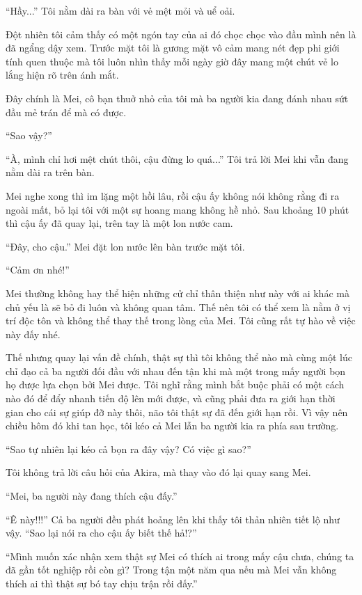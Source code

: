{``Hầy...'' Tôi nằm dài ra bàn với vẻ mệt mỏi và uể oải.

Đột nhiên tôi cảm thấy có một ngón tay của ai đó chọc chọc vào đầu mình
nên là đã ngẩng dậy xem. Trước mặt tôi là gương mặt vô cảm mang nét đẹp
phi giới tính quen thuộc mà tôi luôn nhìn thấy mỗi ngày giờ đây mang một
chút vẻ lo lắng hiện rõ trên ánh mắt.

Đây chính là Mei, cô bạn thuở nhỏ của tôi mà ba người kia đang đánh nhau
sứt đầu mẻ trán để mà có được.

``Sao vậy?''

``À, mình chỉ hơi mệt chút thôi, cậu đừng lo quá...'' Tôi trả lời Mei
khi vẫn đang nằm dài ra trên bàn.

Mei nghe xong thì im lặng một hồi lâu, rồi cậu ấy không nói không rằng
đi ra ngoài mất, bỏ lại tôi với một sự hoang mang không hề nhỏ. Sau
khoảng 10 phút thì cậu ấy đã quay lại, trên tay là một lon nước cam.

``Đây, cho cậu.'' Mei đặt lon nước lên bàn trước mặt tôi.

``Cảm ơn nhé!''

Mei thường không hay thể hiện những cử chỉ thân thiện như này với ai
khác mà chủ yếu là sẽ bỏ đi luôn và không quan tâm. Thế nên tôi có thể
xem là nằm ở vị trí độc tôn và không thể thay thế trong lòng của Mei.
Tôi cũng rất tự hào về việc này đấy nhé.

Thế nhưng quay lại vấn đề chính, thật sự thì tôi không thể nào mà cùng
một lúc chỉ đạo cả ba người đối đầu với nhau đến tận khi mà một trong
mấy người bọn họ được lựa chọn bởi Mei được. Tôi nghĩ rằng mình bắt buộc
phải có một cách nào đó để đẩy nhanh tiến độ lên mới được, và cũng phải
đưa ra giới hạn thời gian cho cái sự giúp đỡ này thôi, não tôi thật sự
đã đến giới hạn rồi. Vì vậy nên chiều hôm đó khi tan học, tôi kéo cả Mei
lẫn ba người kia ra phía sau trường.

``Sao tự nhiên lại kéo cả bọn ra đây vậy? Có việc gì sao?''

Tôi không trả lời câu hỏi của Akira, mà thay vào đó lại quay sang Mei.

``Mei, ba người này đang thích cậu đấy.''

``Ê này!!!'' Cả ba người đều phát hoảng lên khi thấy tôi thản nhiên tiết
lộ như vậy. ``Sao lại nói ra cho cậu ấy biết thế hả!?''

``Mình muốn xác nhận xem thật sự Mei có thích ai trong mấy cậu chưa,
chúng ta đã gần tốt nghiệp rồi còn gì? Trong tận một năm qua nếu mà Mei
vẫn không thích ai thì thật sự bó tay chịu trận rồi đấy.''

}

